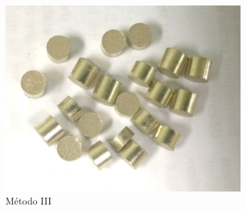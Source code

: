 \documentclass[a4paper,12pt,fleqn,twoside,openany]{book}
\begin{document}
\begin{figure}[h]
\begin{subfigure}{0.25\textwidth}
	\label{fig:PastViruta}
    \end{subfigure}
    ~ %
    \begin{subfigure}{0.25\textwidth}
        \includegraphics[width=\textwidth]{Img/Procedimiento/PastMolienda.jpg}
        \caption{Método III}
        \label{fig:PastMolienda}
    \end{subfigure}
    \begin{subfigure}{0.1\textwidth}

\end{subfigure}
\end{figure}
\end{document}
